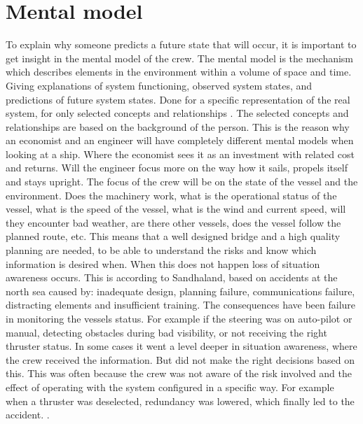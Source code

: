 \section{Mental model}
To explain why someone predicts a future state that will occur, it is important to get insight in the mental model of the crew.
The mental model is the mechanism which describes elements in the environment within a volume of space and time. Giving explanations of system functioning, observed system states, and predictions of future system states. Done for a specific representation of the real system, for only selected concepts and relationships \cite{Kalloniatis2017}. 
The selected concepts and relationships are based on the background of the person. This is the reason why an economist and an engineer will have completely different mental models when looking at a ship. Where the economist sees it as an investment with related cost and returns. Will the engineer focus more on the way how it sails, propels itself and stays upright. 
The focus of the crew will be on the state of the vessel and the environment. Does the machinery work, what is the operational status of the vessel, what is the speed of the vessel, what is the wind and current speed, will they encounter bad weather, are there other vessels, does the vessel follow the planned route, etc. This means that a well designed bridge and a high quality planning are needed, to be able to understand the risks and know which information is desired when. 
When this does not happen loss of situation awareness occurs. This is according to Sandhaland, based on accidents at the north sea caused by: inadequate design, planning failure, communications failure, distracting elements and insufficient training. 
The consequences have been failure in monitoring the vessels status. For example if the steering was on auto-pilot or manual, detecting obstacles during bad visibility, or not receiving the right thruster status. In some cases it went a level deeper in situation awareness, where the crew received the information. But did not make the right decisions based on this. This was often because the crew was not aware of the risk involved and the effect of operating with the system configured in a specific way. For example when a thruster was deselected, redundancy was lowered, which finally led to the accident. \cite{Sandhaland2015}.

